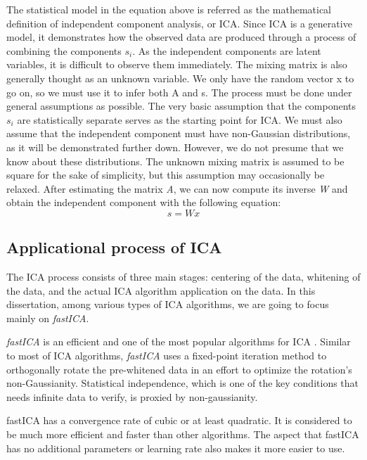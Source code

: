 \begin{definition}
The statistical model in the equation above is referred as the mathematical definition of independent component analysis, or ICA. Since ICA is a generative model, it demonstrates how the observed data are produced through a process of combining the components $s_{i}$. 
As the independent components are latent variables, it is difficult to observe them immediately. The mixing matrix is also generally thought as an unknown variable. We only have the random vector x to go on, so we must use it to infer both A and s. The process must be done under general assumptions as possible. 
The very basic assumption that the components $s_i$ are statistically separate serves as the starting point for ICA. We must also assume that the independent component must have non-Gaussian distributions, as it will be demonstrated further down. However, we do not presume that we know about these distributions. The unknown mixing matrix is assumed to be square for the sake of simplicity, but this assumption may occasionally be relaxed. 
After estimating the matrix \emph{A}, we can now compute its inverse \emph{W} and obtain the independent component with the following equation:
\begin{equation}
s = Wx
\end{equation}

\end{definition}


\subsection{Applicational process of ICA}


The ICA process consists of three main stages: centering of the data, whitening of the data, and the actual ICA algorithm application on the data. In this dissertation, among various types of ICA algorithms, we are going to focus mainly on \emph{fastICA}.

\emph{fastICA} is an efficient and one of the most popular algorithms for ICA \cite{fastICA}. Similar to most of ICA algorithms, \emph{fastICA} uses a fixed-point iteration method to orthogonally rotate the pre-whitened data in an effort to optimize the rotation's non-Gaussianity. Statistical independence, which is one of the key conditions that needs infinite data to verify, is proxied by non-gaussianity. 

fastICA has a convergence rate of cubic or at least quadratic. It is considered to be much more efficient and faster than other algorithms. The aspect that fastICA has no additional parameters or learning rate also makes it more easier to use.

